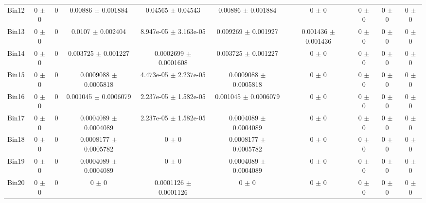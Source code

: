 \begin{tabular}{@{\extracolsep{4pt}}lccccccccc@{}}
     Bin12 & 0 $\pm$ 0 & 0 & 0.00886 $\pm$ 0.001884 & 0.04565 $\pm$ 0.04543 & 0.00886 $\pm$ 0.001884 & 0 $\pm$ 0 & 0 $\pm$ 0 & 0 $\pm$ 0 & 0 $\pm$ 0 \\ 
     Bin13 & 0 $\pm$ 0 & 0 & 0.0107 $\pm$ 0.002404 & 8.947e-05 $\pm$ 3.163e-05 & 0.009269 $\pm$ 0.001927 & 0.001436 $\pm$ 0.001436 & 0 $\pm$ 0 & 0 $\pm$ 0 & 0 $\pm$ 0 \\ 
     Bin14 & 0 $\pm$ 0 & 0 & 0.003725 $\pm$ 0.001227 & 0.0002699 $\pm$ 0.0001608 & 0.003725 $\pm$ 0.001227 & 0 $\pm$ 0 & 0 $\pm$ 0 & 0 $\pm$ 0 & 0 $\pm$ 0 \\ 
     Bin15 & 0 $\pm$ 0 & 0 & 0.0009088 $\pm$ 0.0005818 & 4.473e-05 $\pm$ 2.237e-05 & 0.0009088 $\pm$ 0.0005818 & 0 $\pm$ 0 & 0 $\pm$ 0 & 0 $\pm$ 0 & 0 $\pm$ 0 \\ 
     Bin16 & 0 $\pm$ 0 & 0 & 0.001045 $\pm$ 0.0006079 & 2.237e-05 $\pm$ 1.582e-05 & 0.001045 $\pm$ 0.0006079 & 0 $\pm$ 0 & 0 $\pm$ 0 & 0 $\pm$ 0 & 0 $\pm$ 0 \\ 
     Bin17 & 0 $\pm$ 0 & 0 & 0.0004089 $\pm$ 0.0004089 & 2.237e-05 $\pm$ 1.582e-05 & 0.0004089 $\pm$ 0.0004089 & 0 $\pm$ 0 & 0 $\pm$ 0 & 0 $\pm$ 0 & 0 $\pm$ 0 \\ 
     Bin18 & 0 $\pm$ 0 & 0 & 0.0008177 $\pm$ 0.0005782 & 0 $\pm$ 0 & 0.0008177 $\pm$ 0.0005782 & 0 $\pm$ 0 & 0 $\pm$ 0 & 0 $\pm$ 0 & 0 $\pm$ 0 \\ 
     Bin19 & 0 $\pm$ 0 & 0 & 0.0004089 $\pm$ 0.0004089 & 0 $\pm$ 0 & 0.0004089 $\pm$ 0.0004089 & 0 $\pm$ 0 & 0 $\pm$ 0 & 0 $\pm$ 0 & 0 $\pm$ 0 \\ 
     Bin20 & 0 $\pm$ 0 & 0 & 0 $\pm$ 0 & 0.0001126 $\pm$ 0.0001126 & 0 $\pm$ 0 & 0 $\pm$ 0 & 0 $\pm$ 0 & 0 $\pm$ 0 & 0 $\pm$ 0 \\ 
\hline\hline
  \end{tabular}
